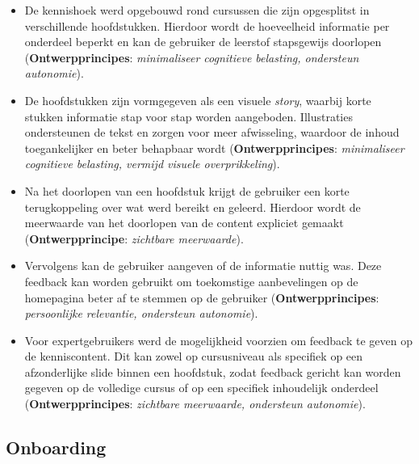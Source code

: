 \vspace{1em}

{\small
    \begin{itemize}
        \item De kennishoek werd opgebouwd rond cursussen die zijn opgesplitst in verschillende hoofdstukken. Hierdoor wordt de hoeveelheid informatie per onderdeel beperkt en kan de gebruiker de leerstof stapsgewijs doorlopen (\textbf{Ontwerpprincipes}: \textit{minimaliseer cognitieve belasting, ondersteun autonomie}).
        
        \item De hoofdstukken zijn vormgegeven als een visuele \textit{story}, waarbij korte stukken informatie stap voor stap worden aangeboden. Illustraties ondersteunen de tekst en zorgen voor meer afwisseling, waardoor de inhoud toegankelijker en beter behapbaar wordt (\textbf{Ontwerpprincipes}: \textit{minimaliseer cognitieve belasting, vermijd visuele overprikkeling}).
        
        \item Na het doorlopen van een hoofdstuk krijgt de gebruiker een korte terugkoppeling over wat werd bereikt en geleerd. Hierdoor wordt de meerwaarde van het doorlopen van de content expliciet gemaakt (\textbf{Ontwerpprincipe}: \textit{zichtbare meerwaarde}).
        
        \item Vervolgens kan de gebruiker aangeven of de informatie nuttig was. Deze feedback kan worden gebruikt om toekomstige aanbevelingen op de homepagina beter af te stemmen op de gebruiker (\textbf{Ontwerpprincipes}: \textit{persoonlijke relevantie, ondersteun autonomie}).
        
        \item Voor expertgebruikers werd de mogelijkheid voorzien om feedback te geven op de kenniscontent. Dit kan zowel op cursusniveau als specifiek op een afzonderlijke slide binnen een hoofdstuk, zodat feedback gericht kan worden gegeven op de volledige cursus of op een specifiek inhoudelijk onderdeel (\textbf{Ontwerpprincipes}: \textit{zichtbare meerwaarde, ondersteun autonomie}).
    \end{itemize}
}

\vspace{1em}


\subsection{Onboarding}
\label{subsec:onboarding-mockups}

